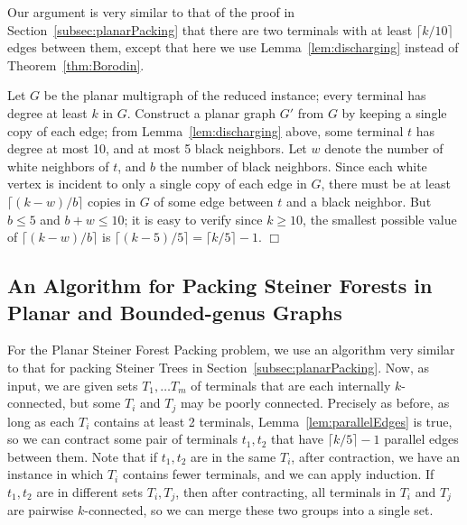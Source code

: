 \documentclass[11pt]{article}
\newenvironment{proofof}[1]{\smallskip\noindent{\bf Proof of #1:}}{\hspace*{\fill}$\Box$\par}
\def\ceil#1{\lceil {#1} \rceil}
\begin{document}
\bigskip
\begin{proofof}{Lemma~\ref{lem:parallelEdges}}
  Our argument is very similar to that of the proof in
  Section~\ref{subsec:planarPacking} that there are two terminals with
    at least $\ceil{k/10}$ edges between them, except that here we use
    Lemma~\ref{lem:discharging} instead of Theorem~\ref{thm:Borodin}.

    Let $G$ be the planar multigraph of the reduced instance; every
    terminal has degree at least $k$ in $G$. Construct a planar graph
    $G'$ from $G$ by keeping a single copy of each edge; from
    Lemma~\ref{lem:discharging} above, some terminal $t$ has degree at
    most 10, and at most 5 black neighbors. Let $w$ denote the number
    of white neighbors of $t$, and $b$ the number of black neighbors.
    Since each white vertex is incident to only a single copy of each
    edge in $G$, there must be at least $\ceil{(k-w)/b}$ copies in
    $G$ of some edge between $t$ and a black neighbor. But $b \le 5$
    and $b+w \le 10$; it is easy to verify since $k \ge 10$, the
    smallest possible value of $\ceil{(k-w)/b}$ is $\ceil{(k-5)/5} =
    \ceil{k/5} - 1$.
\end{proofof}

\subsection{An Algorithm for Packing Steiner Forests in Planar and
  Bounded-genus Graphs}
\label{subsec:forestPacking}

For the Planar Steiner Forest Packing problem, we use an algorithm
very similar to that for packing Steiner Trees in
Section~\ref{subsec:planarPacking}. Now, as input, we are given sets
$T_1, \ldots T_m$ of terminals that are each internally $k$-connected,
but some $T_i$ and $T_j$ may be poorly connected. Precisely as before,
as long as each $T_i$ contains at least 2 terminals,
Lemma~\ref{lem:parallelEdges} is true, so we can contract some pair of
terminals $t_1, t_2$ that have $\ceil{k/5}-1$ parallel edges between
them. Note that if $t_1, t_2$ are in the same $T_i$, after
contraction, we have an instance in which $T_i$ contains fewer
terminals, and we can apply induction. If $t_1, t_2$ are in different
sets $T_i, T_j$, then after contracting, all terminals in $T_i$ and
$T_j$ are pairwise $k$-connected, so we can merge these two groups
into a single set.
\end{document}
